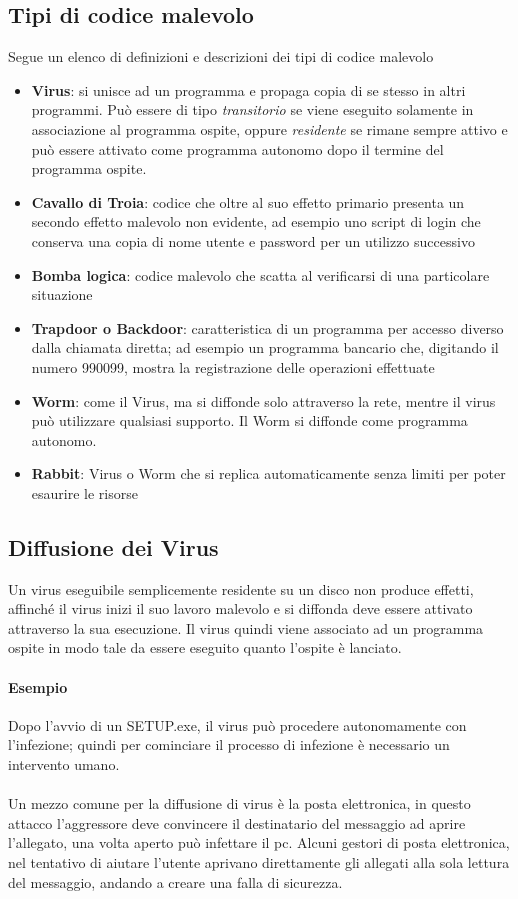\subsection{Tipi di codice malevolo}
Segue un elenco di definizioni e descrizioni dei tipi di codice malevolo
\begin{itemize}
	\item \textbf{Virus}: si unisce ad un programma e propaga copia di se stesso in altri programmi. Può essere di tipo \emph{transitorio} se viene eseguito solamente in associazione al programma ospite, oppure \emph{residente} se rimane sempre attivo e può essere attivato come programma autonomo dopo il termine del programma ospite.
	\item \textbf{Cavallo di Troia}: codice che oltre al suo effetto primario presenta un secondo effetto malevolo non evidente, ad esempio uno script di login che conserva una copia di nome utente e password per un utilizzo successivo
	\item \textbf{Bomba logica}: codice malevolo che scatta al verificarsi di una particolare situazione
	\item \textbf{Trapdoor o Backdoor}: caratteristica di un programma per accesso diverso dalla chiamata diretta; ad esempio un programma bancario che, digitando il numero 990099, mostra la registrazione delle operazioni effettuate
	\item \textbf{Worm}: come il Virus, ma si diffonde solo attraverso la rete, mentre il virus può utilizzare qualsiasi supporto. Il Worm si diffonde come programma autonomo.
	\item \textbf{Rabbit}: Virus o Worm che si replica automaticamente senza limiti per poter esaurire le risorse
\end{itemize}

\subsection{Diffusione dei Virus}
Un virus eseguibile semplicemente residente su un disco non produce effetti, affinché il virus inizi il suo lavoro malevolo e si diffonda deve essere attivato attraverso la sua esecuzione. Il virus quindi viene associato ad un programma ospite in modo tale da essere eseguito quanto l'ospite è lanciato.
\paragraph{Esempio}
Dopo l'avvio di un SETUP.exe, il virus può procedere autonomamente con l'infezione; quindi per cominciare il processo di infezione è necessario un intervento umano. \\ \\
Un mezzo comune per la diffusione di virus è la posta elettronica, in questo attacco l'aggressore deve convincere il destinatario del messaggio ad aprire l'allegato, una volta aperto può infettare il pc.
Alcuni gestori di posta elettronica, nel tentativo di aiutare l'utente aprivano direttamente gli allegati alla sola lettura del messaggio, andando a creare una falla di sicurezza.

